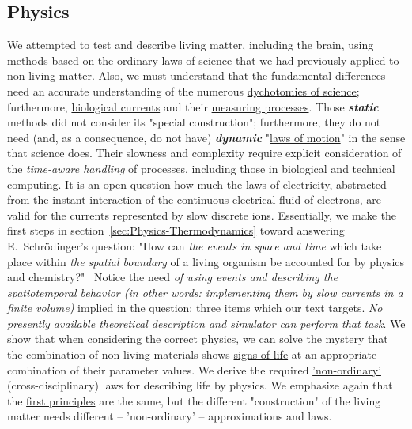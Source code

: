 \subsection*{Physics\label{sec:StatePhysics}}
We attempted to test and describe living matter, including the brain, using methods based on the ordinary laws of science that we had previously applied to non-living matter.
 Also, we must understand that the fundamental differences need an accurate understanding of the
numerous \hyperlink{dichotomy}{dychotomies of science}; furthermore,
\hyperlink{BiologicalCurrent}{biological currents} and their \hyperlink{voltage-clamping}{measuring processes}.
Those \textbf{\textit{static}} methods did not consider its "special construction"; furthermore, they do not need (and, as a consequence, do not have) \textbf{\textit{dynamic}} "\hyperlink{PhysicsLawsOfMotion}{laws of motion}" in the sense that science does.
Their slowness and complexity require explicit consideration of the \textit{time-aware handling} of processes, including those in biological and technical computing.  It is an open question how much the laws of electricity, abstracted from the instant interaction of the
continuous electrical fluid of electrons, are valid for the currents represented by slow discrete ions.
Essentially, we make the first steps in section~\ref{sec:Physics-Thermodynamics} toward answering E.~Schrödinger's question: "How can \textit{the events in space and time} which take place within \textit{the spatial boundary }of a living organism be accounted for by physics and chemistry?"~\cite{Schrodinger:1992} Notice the need \textit{of using events and describing the spatiotemporal behavior (in other words: implementing them by slow currents in a finite volume)} implied in the question; three items which
our text targets.
\textit{No presently available theoretical description and simulator can perform that task}.
We show that when considering the correct physics,
we can solve the mystery that the combination of non-living materials shows
\hyperlink{SignsOfLife}
{signs of life} at an appropriate combination of their parameter values. We derive the required \hyperlink{NonOrdinaryLaws}{'non-ordinary'} (cross-disciplinary) laws for describing life by physics.
We emphasize again that the \href{https://en.wikipedia.org/wiki/First_principle}{first principles} are the same, but the
different "construction" of the living matter needs different --  'non-ordinary' -- approximations
and laws.


